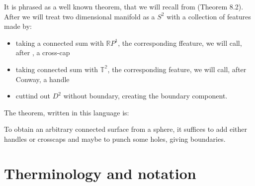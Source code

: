 It is phrased as a well known theorem, that we will recall from \cite{Conway2016} (Theorem 8.2).
After \cite{Conway2016} we will treat two dimensional manifold as a $S^2$ with a collection of features 
made by:
\begin{itemize}
\item taking a connected sum with $\mathbb{R}P^1$, the corresponding ffeature, 
we will call, after \cite{Conway2016}, a cross-cap
\item taking connected sum with $\mathbb{T^2}$, the corresponding feature, we will call, 
after Conway, a handle
\item cuttind out $D^2$ without boundary, creating the boundary component. 
\end{itemize}
The theorem, written in this language is:
\begin{theorem}
To obtain an
arbitrary connected surface from a sphere, it suffices to add either
handles or crosscaps and maybe to punch some holes, giving
boundaries.
\end{theorem}





\section{Therminology and notation}\label{therminology and notation}
